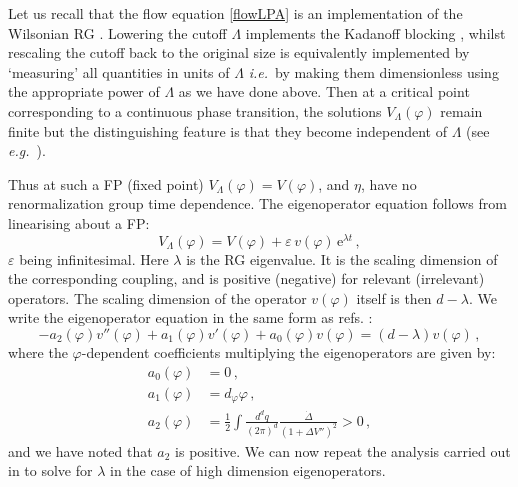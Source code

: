 \documentclass[11pt,a4paper]{article}
\numberwithin{figure}{section}
\numberwithin{equation}{section}
\newcommand\ie{\textit{i.e.}\ }
\newcommand\eg{\textit{e.g.}\ }
\newcommand{\ph}{\varphi}
\newcommand{\e}{\text{e}}
\begin{document}
Let us recall that the flow equation \eqref{flowLPA} is an implementation of the Wilsonian RG \cite{Wilson:1973,Morris:1998}. Lowering the cutoff $\Lambda$ implements the Kadanoff blocking \cite{Kadanoff:1966wm}, whilst rescaling the cutoff back to the original size is equivalently implemented by `measuring' all quantities in units of $\Lambda$ \ie by making them dimensionless using the appropriate power of $\Lambda$ \cite{Morris:1998} as we have done above. Then at a critical point corresponding to a continuous phase transition, the solutions $V_\Lambda(\ph)$ remain finite but the distinguishing feature is that they become independent of $\Lambda$ (see \eg \cite{Morris:1998}).

Thus at such a FP (fixed point) $V_\Lambda (\varphi)=V(\varphi)$, and $\eta$, have no renormalization group time dependence. The eigenoperator equation follows from linearising about a FP:
\begin{equation}
\label{eigenop}
    V_\Lambda(\varphi)= V(\ph)+\varepsilon\, v(\ph) \,\e^{\lambda t} \,,
\end{equation}
$\varepsilon$ being infinitesimal. Here $\lambda$ is the RG eigenvalue.  It is the scaling dimension of the corresponding coupling, and is positive (negative) for relevant (irrelevant) operators. The scaling dimension of the operator $v(\ph)$ itself is then $d-\lambda$. We write the eigenoperator equation in the same form as refs. \cite{Benedetti:2013jk,Mitchell:2021qjr,Morris:2022btf}:
\begin{equation}
    -a_2(\ph)v''(\ph)+a_1(\ph)v'(\ph)+a_0(\ph)v(\ph)=(d-\lambda)v(\ph)\,, \label{eig}
\end{equation}
where the $\ph$-dependent coefficients multiplying the eigenoperators are given by: 
\begin{align}
    a_0(\ph) &= 0 \,, \\
    a_1(\ph) &= d_\ph \ph \,,\label{a1} \\
    a_2(\ph) &= \frac12\int \frac{d^d q}{(2\pi)^d}\frac{\dot{\Delta}}{(1+\Delta V'')^2} >0\,, \label{a2}
\end{align}
and we have noted that $a_2$ is positive. 
We can now repeat the analysis carried out in \cite{Benedetti:2013jk,Mitchell:2021qjr,Morris:2022btf} to solve for $\lambda$ in the case of high dimension eigenoperators. 
\end{document}
